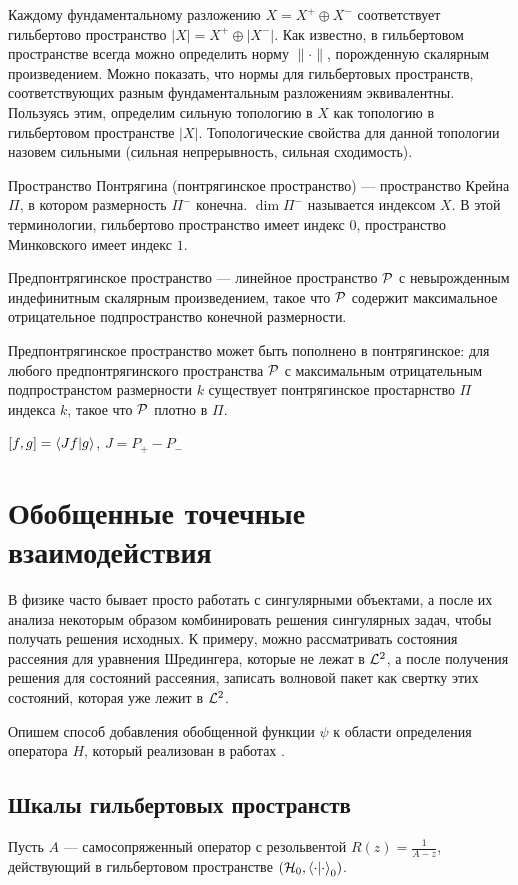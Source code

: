 Каждому фундаментальному разложению $X = X^+ \oplus X^-$ соответствует гильбертово пространство $|X| = X^+ \oplus |X^-|$. Как известно, в гильбертовом пространстве всегда можно определить норму $\| \cdot \|$, порожденную скалярным произведением. Можно показать, что нормы для гильбертовых пространств, соответствующих разным фундаментальным разложениям эквивалентны. Пользуясь этим, определим сильную топологию в $X$ как топологию в гильбертовом пространстве $|X|$. Топологические свойства для данной топологии назовем сильными (сильная непрерывность, сильная сходимость).

Пространство Понтрягина (понтрягинское пространство) — пространство Крейна $\Pi$, в котором размерность $\Pi^-$ конечна. $\dim \Pi^-$ называется индексом $X$. В этой терминологии, гильбертово пространство имеет индекс $0$, пространство Минковского имеет индекс $1$.

Предпонтрягинское пространство — линейное пространство $\mathcal{P}$ с невырожденным индефинитным скалярным произведением, такое что $\mathcal{P}$ содержит максимальное отрицательное подпространство конечной размерности. 

Предпонтрягинское пространство может быть пополнено в понтрягинское: для любого предпонтрягинского пространства $\mathcal{P}$ с максимальным отрицательным подпространстом размерности $k$ существует понтрягинское простарнство $\Pi$ индекса $k$, такое что $\mathcal{P}$ плотно в $\Pi$.

$[f, g] = \ip{J f}{g}$, $J = P_+ - P_-$


\section{Обобщенные точечные взаимодействия}
В физике часто бывает просто работать с сингулярными объектами, а после их анализа некоторым образом комбинировать решения сингулярных задач, чтобы получать решения исходных. К примеру, можно рассматривать состояния рассеяния для уравнения Шредингера, которые не лежат в $\mathcal{L}^2$, а после получения решения для состояний рассеяния, записать волновой пакет как свертку этих состояний, которая уже лежит в $\mathcal{L}^2$. 

Опишем способ добавления обобщенной функции $\psi$ к области определения оператора $H$, который реализован в работах \cite{van1991scattering, dijksma2000self, dijksma2000singular}.

\subsection{Шкалы гильбертовых пространств}
Пусть $A$ — самосопряженный оператор с резольвентой $R(z) = \frac{1}{A - z}$, действующий в гильбертовом пространстве $(\hilb{0}, \ipcdot_0)$.

